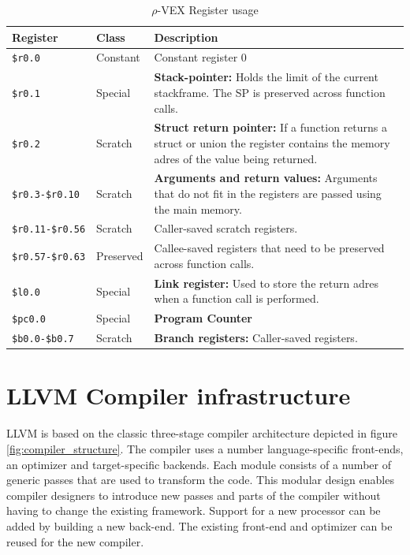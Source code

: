 \begin{table}
  \centering
    \begin{tabular}{|l|l|p{10cm}|}
    \hline
    \textbf{Register} & \textbf{Class} & \textbf{Description}   \\ \hline
    \texttt{\$r0.0}         & Constant  & Constant register 0  \\ \hline
    \texttt{\$r0.1}         & Special   & \textbf{Stack-pointer:} Holds the limit of the current stackframe. 
                                          The SP is preserved across function calls.  \\ \hline
    \texttt{\$r0.2}         & Scratch   & \textbf{Struct return pointer:} If a function returns a struct or union the register
                                          contains the memory adres of the value being returned.  \\ \hline
    \texttt{\$r0.3-\$r0.10} & Scratch   & \textbf{Arguments and return values:} Arguments that do not fit in the registers are
                                          passed using the main memory.  \\ \hline
    \texttt{\$r0.11-\$r0.56}& Scratch   & Caller-saved scratch registers.  \\ \hline
    \texttt{\$r0.57-\$r0.63}& Preserved & Callee-saved registers that need to be preserved across function calls.  \\ \hline
    \texttt{\$l0.0}         & Special   & \textbf{Link register:} Used to store the return adres when a function call is 
                                          performed.  \\ \hline
    \texttt{\$pc0.0}        & Special   & \textbf{Program Counter}  \\ \hline
    \texttt{\$b0.0-\$b0.7}  & Scratch   & \textbf{Branch registers:} Caller-saved registers.  \\ \hline
    \end{tabular}
  \caption{$\rho$-VEX Register usage \cite{Joseph-A.-Fisher:2012rm}}
  \label{tbl:rvex_reg}
\end{table}

\section{LLVM Compiler infrastructure}
LLVM is based on the classic three-stage compiler architecture depicted in figure \ref{fig:compiler_structure}. The compiler uses a number language-specific front-ends, an optimizer and target-specific backends. Each module consists of a number of generic passes that are used to transform the code. This modular design enables compiler designers to introduce new passes and parts of the compiler without having to change the existing framework. Support for a new processor can be added by building a new back-end. The existing front-end and optimizer can be reused for the new compiler.

